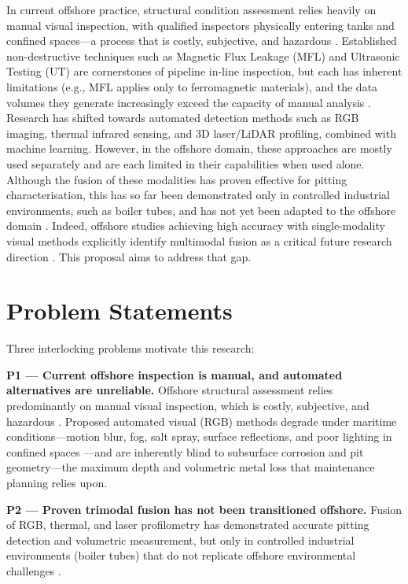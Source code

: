 \documentclass[conference]{IEEEtran}
\begin{document}
In current offshore practice, structural condition assessment relies heavily on manual visual inspection, with qualified inspectors physically entering tanks and confined spaces—a process that is costly, subjective, and hazardous \cite{soares2023autonomous}. Established non-destructive techniques such as Magnetic Flux Leakage (MFL) and Ultrasonic Testing (UT) are cornerstones of pipeline in-line inspection, but each has inherent limitations (e.g., MFL applies only to ferromagnetic materials), and the data volumes they generate increasingly exceed the capacity of manual analysis \cite{olawole2026advanced}. Research has shifted towards automated detection methods such as RGB imaging, thermal infrared sensing, and 3D laser/LiDAR profiling, combined with machine learning. However, in the offshore domain, these approaches are mostly used separately and are each limited in their capabilities when used alone. Although the fusion of these modalities has proven effective for pitting characterisation, this has so far been demonstrated only in controlled industrial environments, such as boiler tubes, and has not yet been adapted to the offshore domain \cite{zhang2026application}. Indeed, offshore studies achieving high accuracy with single-modality visual methods explicitly identify multimodal fusion as a critical future research direction \cite{imran2025ship}. This proposal aims to address that gap.

\section{Problem Statements}

Three interlocking problems motivate this research:

\textbf{P1 --- Current offshore inspection is manual, and automated alternatives are unreliable.} Offshore structural assessment relies predominantly on manual visual inspection, which is costly, subjective, and hazardous \cite{soares2023autonomous}. Proposed automated visual (RGB) methods degrade under maritime conditions—motion blur, fog, salt spray, surface reflections, and poor lighting in confined spaces \cite{soares2023autonomous, imran2025ship}—and are inherently blind to subsurface corrosion and pit geometry—the maximum depth and volumetric metal loss that maintenance planning relies upon.

\textbf{P2 --- Proven trimodal fusion has not been transitioned offshore.} Fusion of RGB, thermal, and laser profilometry has demonstrated accurate pitting detection and volumetric measurement, but only in controlled industrial environments (boiler tubes) that do not replicate offshore environmental challenges \cite{zhang2026application}.
\end{document}
